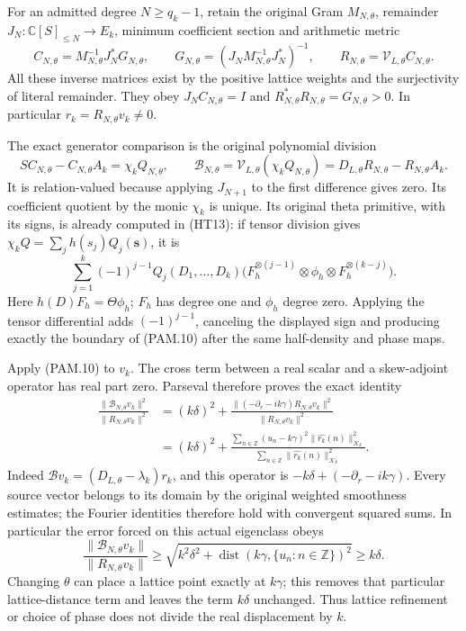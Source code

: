 For an admitted degree \(N\ge q_k-1\), retain the original Gram
\(M_{N,\theta}\), remainder \(J_N:\mathbb C[S]_{\le N}\to E_k\),
minimum coefficient section and arithmetic metric
\[
 C_{N,\theta}=M_{N,\theta}^{-1}J_N^*G_{N,\theta},\qquad
 G_{N,\theta}=(J_NM_{N,\theta}^{-1}J_N^*)^{-1},\qquad
 R_{N,\theta}=\mathcal V_{L,\theta}C_{N,\theta}.
 \tag{PAM.9}\label{CFStage:eq:pam-section}
\]
All these inverse matrices exist by the positive lattice weights and
the surjectivity of literal remainder. They obey
\(J_NC_{N,\theta}=I\) and \(R_{N,\theta}^*R_{N,\theta}=G_{N,\theta}>0\).
In particular \(r_k=R_{N,\theta}v_k\ne0\).

The exact generator comparison is the original polynomial division
\[
 SC_{N,\theta}-C_{N,\theta}A_k=\chi_k Q_{N,\theta},\qquad
 \mathscr B_{N,\theta}
 =\mathcal V_{L,\theta}(\chi_k Q_{N,\theta})
 =D_{L,\theta}R_{N,\theta}-R_{N,\theta}A_k .
 \tag{PAM.10}\label{CFStage:eq:pam-boundary}
\]
It is relation-valued because applying \(J_{N+1}\) to the first
difference gives zero. Its coefficient quotient by the monic
\(\chi_k\) is unique. Its original theta primitive, with its signs,
is already computed in (HT13): if tensor division gives
\(\chi_kQ=\sum_jh(s_j)Q_j(\mathbf s)\), it is
\[
 \sum_{j=1}^k(-1)^{j-1}Q_j(D_1,\ldots,D_k)
 \bigl(F_h^{\otimes(j-1)}\otimes\phi_h\otimes
                         F_h^{\otimes(k-j)}\bigr).
 \tag{PAM.11}\label{CFStage:eq:pam-primitive}
\]
Here \(h(D)F_h=\Theta\phi_h\); \(F_h\) has degree one and
\(\phi_h\) degree zero. Applying the tensor differential adds
\((-1)^{j-1}\), canceling the displayed sign and producing exactly
the boundary of (PAM.10) after the same half-density and phase maps.

Apply (PAM.10) to \(v_k\). The cross term between a real scalar and
a skew-adjoint operator has real part zero. Parseval therefore proves
the exact identity
\[
 \begin{split}
 \frac{\|\mathscr B_{N,\theta}v_k\|^2}{\|R_{N,\theta}v_k\|^2}
 &=(k\delta)^2+
 \frac{\|(-\partial_r-ik\gamma)R_{N,\theta}v_k\|^2}
      {\|R_{N,\theta}v_k\|^2}\\
 &=(k\delta)^2+
 \frac{\sum_{n\in\mathbb Z}(u_n-k\gamma)^2
                   \|\widehat{r_k}(n)\|_{\mathcal K_k}^2}
      {\sum_{n\in\mathbb Z}\|\widehat{r_k}(n)\|_{\mathcal K_k}^2}.
 \end{split}
 \tag{PAM.12}\label{CFStage:eq:pam-exactdistance}
\]
Indeed \(\mathscr Bv_k=(D_{L,\theta}-\lambda_k)r_k\), and this
operator is \(-k\delta+(-\partial_r-ik\gamma)\).
Every source vector belongs to its domain by the original weighted
smoothness estimates; the Fourier identities therefore hold with
convergent squared sums.
In particular the error forced on this actual eigenclass obeys
\[
 \frac{\|\mathscr B_{N,\theta}v_k\|}{\|R_{N,\theta}v_k\|}
 \ge\sqrt{k^2\delta^2+
              \operatorname{dist}(k\gamma,\{u_n:n\in\mathbb Z\})^2}
 \ge k\delta .
 \tag{PAM.13}\label{CFStage:eq:pam-errorlower}
\]
Changing \(\theta\) can place a lattice point exactly at \(k\gamma\);
this removes that particular lattice-distance term and leaves
the term \(k\delta\) unchanged. Thus lattice refinement or choice
of phase does not divide the real displacement by \(k\).

